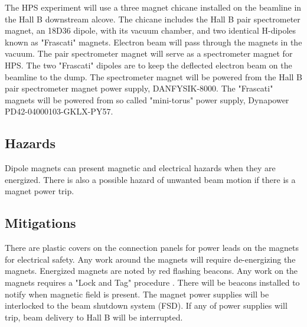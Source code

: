 

The HPS experiment will use a three magnet chicane installed on the beamline in the Hall B downstream alcove. The chicane includes the Hall B pair spectrometer magnet, an 18D36 dipole, with its vacuum chamber, and two identical H-dipoles known as "Frascati" magnets. Electron beam will pass through the magnets in the vacuum. The pair spectrometer magnet will serve as a spectrometer magnet for HPS. The two "Frascati" dipoles are to keep the deflected electron beam on the beamline to the dump. The spectrometer magnet will be powered from the Hall B pair spectrometer magnet power supply, DANFYSIK-8000. The "Frascati" magnets will be powered from so called "mini-torus" power supply, Dynapower PD42-04000103-GKLX-PY57.   

\subsection{Hazards} 
\indent

Dipole magnets can present magnetic and electrical hazards when they are energized. There is also a possible hazard of unwanted beam motion if there is a magnet power trip.  



\subsection{Mitigations}
\indent

There are plastic covers on the connection panels for power leads on the magnets for electrical safety. Any work around the magnets will require de-energizing the magnets. Energized magnets are noted by red flashing beacons. Any work on the magnets requires a "Lock and Tag" procedure \cite{EHScebaf}. There will be beacons installed to notify when magnetic field is present. The magnet power supplies will be interlocked to the beam shutdown system (FSD). If any of power supplies will trip, beam delivery to Hall B will be interrupted.

